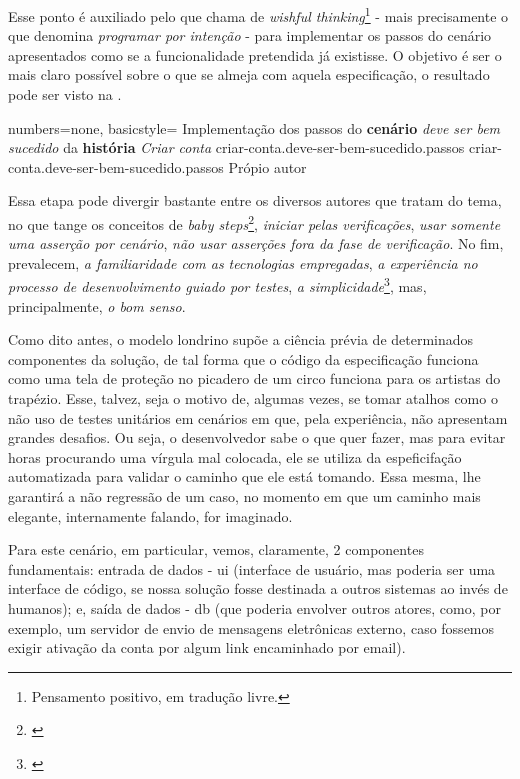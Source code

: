   Esse ponto é auxiliado pelo que  chama de \emph{wishful thinking}\footnote{Pensamento positivo, em tradução livre.} - mais precisamente o que  denomina \emph{programar por intenção} - para implementar os passos do cenário apresentados como se a funcionalidade pretendida já existisse. O objetivo é ser o mais claro possível sobre o que se almeja com aquela especificação, o resultado pode ser visto na .

  \codigo
    {numbers=none, basicstyle=\ttfamily\tiny}
    {Implementação dos passos do \textbf{cenário} \emph{deve ser bem sucedido} da \textbf{história} \emph{Criar conta}}
    {criar-conta.deve-ser-bem-sucedido.passos}
    {criar-conta.deve-ser-bem-sucedido.passos}
    {Própio autor}

  Essa etapa pode divergir bastante entre os diversos autores que tratam do tema, no que tange os conceitos de \emph{baby steps}\footnote{\cite[pág. 1]{Aniche2011}}, \emph{iniciar pelas verificações}, \emph{usar somente uma asserção por cenário}, \emph{não usar asserções fora da fase de verificação}. No fim, prevalecem, \emph{a familiaridade com as tecnologias empregadas}, \emph{a experiência no processo de desenvolvimento guiado por testes}, \emph{a simplicidade}\footnote{\cite[pág. TODO]{Beck2003}}, mas, principalmente, \emph{o bom senso}.

  Como dito antes, o modelo londrino supõe a ciência prévia de determinados componentes da solução, de tal forma que o código da especificação funciona como uma tela de proteção no picadero de um circo funciona para os artistas do trapézio. Esse, talvez, seja o motivo de, algumas vezes, se tomar atalhos como o não uso de testes unitários em cenários em que, pela experiência, não apresentam grandes desafios. Ou seja, o desenvolvedor sabe o que quer fazer, mas para evitar horas procurando uma vírgula mal colocada, ele se utiliza da espeficifação automatizada para validar o caminho que ele está tomando. Essa mesma, lhe garantirá a não regressão de um caso, no momento em que um caminho mais elegante, internamente falando, for imaginado.

  Para este cenário, em particular, vemos, claramente, 2 componentes fundamentais: entrada de dados - ui (interface de usuário, mas poderia ser uma interface de código, se nossa solução fosse destinada a outros sistemas ao invés de humanos); e, saída de dados - db (que poderia envolver outros atores, como, por exemplo, um servidor de envio de mensagens eletrônicas externo, caso fossemos exigir ativação da conta por algum link encaminhado por email).

